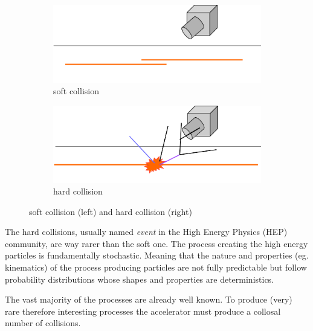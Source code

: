 \begin{figure}[htb]
  \centering
  \begin{subfigure}[t]{0.49\linewidth}
    \includegraphics[width=\linewidth]{particle_collider_soft}
    \caption{soft collision}
    \label{fig:soft_collision}
  \end{subfigure}%
  \hfill
  \begin{subfigure}[t]{0.49\linewidth}
    \includegraphics[width=\linewidth]{particle_collider_hard}
    \caption{hard collision}
    \label{fig:hard_collision}
  \end{subfigure}
  \caption{soft collision (left) and hard collision (right)}
  \label{fig:collision}
\end{figure}

The hard collisions, usually named \emph{event} in the High Energy Physics (HEP) community, are way rarer than the soft one.
The process creating the high energy particles is fundamentally stochastic.
Meaning that the nature and properties (eg. kinematics) of the process producing particles are not fully predictable but follow
probability distributions whose shapes and properties are deterministics.

The vast majority of the processes are already well known.
To produce (very) rare therefore interesting processes the accelerator must produce a collosal number of collisions.

